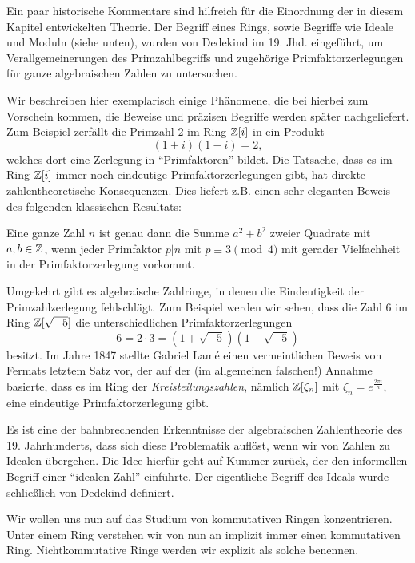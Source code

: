 \documentclass{book}
\begin{document}
Ein paar historische Kommentare sind hilfreich für die Einordnung der in diesem
Kapitel entwickelten Theorie. Der Begriff eines Rings, sowie Begriffe wie
Ideale und Moduln (siehe unten), wurden von Dedekind im 19. Jhd. eingeführt, um
Verallgemeinerungen des Primzahlbegriffs und zugehörige Primfaktorzerlegungen
für ganze algebraischen Zahlen zu untersuchen. 

Wir beschreiben hier exemplarisch einige Phänomene, die bei hierbei zum
Vorschein kommen, die Beweise und präzisen Begriffe werden später
nachgeliefert. Zum Beispiel zerfällt die Primzahl $2$ im Ring $\mathbb{Z}[i]$ in ein
Produkt
\[
    (1+i)(1-i) = 2 ,
\]
welches dort eine Zerlegung in ``Primfaktoren'' bildet.
Die Tatsache, dass es im Ring $\mathbb{Z}[i]$ immer noch eindeutige
Primfaktorzerlegungen gibt, hat direkte zahlentheoretische Konsequenzen. Dies
liefert z.B. einen sehr eleganten Beweis des folgenden klassischen Resultats:

\begin{thm}
    \label{thm:quadrat_summe}
    Eine ganze Zahl $n$ ist genau dann die Summe $a^2 + b^2$ zweier
    Quadrate mit $a,b \in \mathbb{Z}$, wenn jeder Primfaktor $p | n $ mit $p \equiv 3
    \pmod{4}$ mit gerader Vielfachheit in der Primfaktorzerlegung vorkommt.
\end{thm}

Umgekehrt gibt es algebraische Zahlringe, in denen die Eindeutigkeit der
Primzahlzerlegung fehlschlägt. Zum Beispiel werden wir sehen, dass die Zahl $6$
im Ring $\mathbb{Z}[\sqrt{-5}]$ die unterschiedlichen Primfaktorzerlegungen 
\[
    6 = 2 \cdot 3 = (1 + \sqrt{-5})(1 - \sqrt{-5})
\]
besitzt. Im Jahre 1847 stellte Gabriel Lam\'{e} einen vermeintlichen Beweis von
Fermats letztem Satz vor, der auf der (im allgemeinen falschen!) Annahme
basierte, dass es im Ring der {\em Kreisteilungszahlen}, nämlich $\mathbb{Z}[\zeta_n]$
mit $\zeta_n = e^{\frac{2 \pi i}{n}}$, eine eindeutige Primfaktorzerlegung
gibt.

Es ist eine der bahnbrechenden Erkenntnisse der algebraischen Zahlentheorie des
19. Jahrhunderts, dass sich diese Problematik auflöst, wenn wir von Zahlen zu
Idealen übergehen. Die Idee hierfür geht auf Kummer zurück, der den informellen
Begriff einer ``idealen Zahl'' einführte. Der eigentliche Begriff des Ideals
wurde schließlich von Dedekind definiert.

\begin{konv}
    Wir wollen uns nun auf das Studium von kommutativen Ringen konzentrieren.
    Unter einem Ring verstehen wir von nun an implizit immer einen kommutativen
    Ring. Nichtkommutative Ringe werden wir explizit als solche benennen. 
\end{konv}
\end{document}
